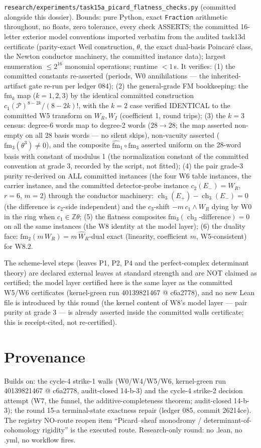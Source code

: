 \documentclass[11pt]{article}
\newcommand{\WR}{W_R}
\newcommand{\WI}{W_I}
\newcommand{\ch}{\operatorname{ch}}
\begin{document}
\texttt{research/experiments/task15a\_picard\_flatness\_checks.py}
(committed alongside this dossier). Bounds: pure Python, exact
\texttt{Fraction} arithmetic throughout, no floats, zero tolerance, every
check ASSERTS; the committed 16-letter exterior model conventions imported
verbatim from the audited task13d certificate (parity-exact Weil
construction, $\theta$, the exact dual-basis Poincar\'e class, the Newton
conductor machinery, the committed instance data); largest enumeration
$\le 2^{16}$ monomial operations; runtime $< 1$\,s. It verifies:
(1) the committed constants re-asserted (periods, W0 annihilations ---
the inherited-artifact gate re-run per ledger 084);
(2) the general-grade FM bookkeeping: the $\mathrm{fm}_k$ map
($k=1,2,3$) by the identical committed construction
$c_1(\mathcal{P})^{8-2k}/(8-2k)!$, with the $k=2$ case verified IDENTICAL
to the committed W5 transform on $\WR,\WI$ (coefficient 1, round trips);
(3) the $k=3$ census: degree-6 words map to degree-2 words
($28 \to 28$; the map asserted non-empty on all 28 basis words --- no
silent skips), non-vacuity asserted ($\mathrm{fm}_3(\theta^3)\ne 0$),
and the composite $\widehat{\mathrm{fm}}_1\circ \mathrm{fm}_3$ asserted
uniform on the 28-word basis with constant of modulus 1 (the
normalization constant of the committed convention at grade 3, recorded
by the script, not fitted);
(4) the pair grade-3 purity re-derived on ALL committed instances (the
four W6 table instances, the carrier instance, and the committed
detector-probe instance $c_2(E_-)=\WR$, $r=6$, $m=2$) through the
conductor machinery: $\ch_3(E_+) - \ch_3(E_-) = 0$ (the difference is
$c_2$-side independent) and the $c_3$-shift
$-m\,c_1\wedge\WR$ dying by W0 in the ring when $c_1\in\mathbb{Z}\theta$;
(5) the flatness composites $\mathrm{fm}_3(\ch_3\text{-difference}) = 0$
on all the same instances (the W8 identity at the model layer);
(6) the duality face: $\mathrm{fm}_2(m\,\WR) = m\,\widehat\WR$-dual exact
(linearity, coefficient $m$, W5-consistent) for W8.2.

The scheme-level steps (leaves P1, P2, P4 and the perfect-complex
determinant theory) are declared external leaves at standard strength and
are NOT claimed as certified; the model layer certified here is the same
layer as the committed W5/W6 certificates (kernel-green run 40139821467 @
c6a2778), and no new Lean file is introduced by this round (the kernel
content of W8's model layer --- pair purity at grade 3 --- is already
asserted inside the committed walls certificate; this is receipt-cited, not
re-certified).

\section{Provenance}

Builds on: the cycle-4 strike-1 walls (W0/W4/W5/W6, kernel-green run
40139821467 @ c6a2778, audit-closed 14-b-3) and the cycle-4 strike-2
decision attempt (W7, the funnel, the additive-completeness theorem;
audit-closed 14-b-3); the round 15-a terminal-state exactness repair
(ledger 085, commit 26214ce). The registry NO-route reopen item
``Picard--sheaf monodromy / determinant-of-cohomology rigidity'' is the
executed route. Research-only round: no .lean, no .yml, no workflow fires.
\end{document}
